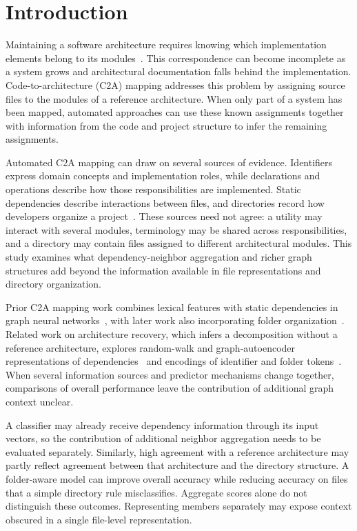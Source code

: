 \section{Introduction\label{sec:intro}}

Maintaining a software architecture requires knowing which implementation elements belong to its modules~\cite{parnas1972,clements2003}. This correspondence can become incomplete as a system grows and architectural documentation falls behind the implementation. Code-to-architecture (C2A) mapping addresses this problem by assigning source files to the modules of a reference architecture. When only part of a system has been mapped, automated approaches can use these known assignments together with information from the code and project structure to infer the remaining assignments.

Automated C2A mapping can draw on several sources of evidence. Identifiers express domain concepts and implementation roles, while declarations and operations describe how those responsibilities are implemented. Static dependencies describe interactions between files, and directories record how developers organize a project~\cite{sarif,negar,garcia2013}. These sources need not agree: a utility may interact with several modules, terminology may be shared across responsibilities, and a directory may contain files assigned to different architectural modules. This study examines what dependency-neighbor aggregation and richer graph structures add beyond the information available in file representations and directory organization.

Prior C2A mapping work combines lexical features with static dependencies in graph neural networks~\cite{jabeen2025graph}, with later work also incorporating folder organization~\cite{c2a_mapping}. Related work on architecture recovery, which infers a decomposition without a reference architecture, explores random-walk and graph-autoencoder representations of dependencies~\cite{negar,structsar} and encodings of identifier and folder tokens~\cite{gaer}. When several information sources and predictor mechanisms change together, comparisons of overall performance leave the contribution of additional graph context unclear.

A classifier may already receive dependency information through its input vectors, so the contribution of additional neighbor aggregation needs to be evaluated separately. Similarly, high agreement with a reference architecture may partly reflect agreement between that architecture and the directory structure. A folder-aware model can improve overall accuracy while reducing accuracy on files that a simple directory rule misclassifies. Aggregate scores alone do not distinguish these outcomes. Representing members separately may expose context obscured in a single file-level representation.

